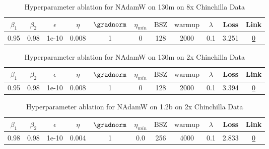 \begin{table}[H]
\centering
\caption{Hyperparameter ablation for NAdamW on 130m on 8x Chinchilla Data}
\label{tab:ablation_nadamw_130m_8}
\begin{tabular}{ccccccccccc}
\toprule
$\beta_1$ & $\beta_2$ & $\epsilon$ & $\eta$ & $\gradnorm$ & $\eta_{min}$ & $\mathrm{BSZ}$ & $\mathrm{warmup}$ & $\lambda$ & Loss & Link \\
\midrule
0.95 & 0.98 & 1e-10 & 0.008 & 1 & 0 & 128 & 2000 & 0.1 & 3.251 & \href{https://wandb.ai/stanford-mercury/optimizer-scaling/runs/sweep-130m-21B-nadamw6383f8lr0.008-wd0.1-minlr0-warmup2000-b10.9-044a64}{0} \\
\midrule
\bottomrule
\end{tabular}
\end{table}

\begin{table}[H]
\centering
\caption{Hyperparameter ablation for NAdamW on 130m on 2x Chinchilla Data}
\label{tab:ablation_nadamw_130m_2}
\begin{tabular}{ccccccccccc}
\toprule
$\beta_1$ & $\beta_2$ & $\epsilon$ & $\eta$ & $\gradnorm$ & $\eta_{min}$ & $\mathrm{BSZ}$ & $\mathrm{warmup}$ & $\lambda$ & Loss & Link \\
\midrule
0.95 & 0.98 & 1e-10 & 0.008 & 1 & 0 & 128 & 2000 & 0.1 & 3.394 & \href{https://wandb.ai/stanford-mercury/optimizer-scaling/runs/sweep-130m-5B-nadamw1c5657lr0.008-wd0.1-minlr0-warmup2000-b10.95-2e57b5}{0} \\
\midrule
\bottomrule
\end{tabular}
\end{table}

\begin{table}[H]
\centering
\caption{Hyperparameter ablation for NAdamW on 1.2b on 2x Chinchilla Data}
\label{tab:ablation_nadamw_1.2b_2}
\begin{tabular}{ccccccccccc}
\toprule
$\beta_1$ & $\beta_2$ & $\epsilon$ & $\eta$ & $\gradnorm$ & $\eta_{min}$ & $\mathrm{BSZ}$ & $\mathrm{warmup}$ & $\lambda$ & Loss & Link \\
\midrule
0.98 & 0.98 & 1e-10 & 0.004 & 1 & 0.0 & 256 & 4000 & 0.1 & 2.833 & \href{https://wandb.ai/stanford-mercury/optimizer-scaling/runs/sweep-1.2b-48B-nadamwcb7c09lr0.004-wd0.1-minlr0.0-warmup4000-b10-cf4ac5}{0} \\
\midrule
\bottomrule
\end{tabular}
\end{table}

